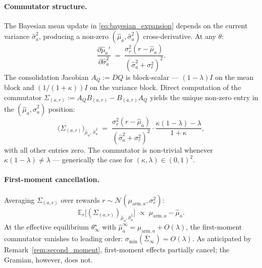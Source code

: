 \documentclass[12pt,a4paper]{article}
\begin{document}
\paragraph{Commutator structure.}
The Bayesian mean update in \eqref{eq:bayesian_expansion} depends on the
current variance $\hat\sigma_a^2$, producing a non-zero $(\hat\mu_a, \hat\sigma_a^2)$
cross-derivative. At any $\theta$:
\[
  \frac{\partial \hat\mu_a'}{\partial \hat\sigma_a^2}
  \;=\; \frac{\sigma_r^2(r - \hat\mu_a)}{(\hat\sigma_a^2 + \sigma_r^2)^2}.
\]
The consolidation Jacobian $A_Q := DQ$ is block-scalar — $(1-\lambda)I$
on the mean block and $(1/(1+\kappa))I$ on the variance block. Direct
computation of the commutator $\Sigma_{(a,r)} := A_Q B_{(a,r)} - B_{(a,r)} A_Q$
yields the unique non-zero entry in the $(\hat\mu_a, \hat\sigma_a^2)$
position:
\begin{equation}
\label{eq:bandit_commutator}
\bigl(\Sigma_{(a,r)}\bigr)_{\hat\mu_a,\,\hat\sigma_a^2}
\;=\; \frac{\sigma_r^2(r - \hat\mu_a)}{(\hat\sigma_a^2 + \sigma_r^2)^2}
      \cdot \frac{\kappa(1-\lambda) - \lambda}{1+\kappa},
\end{equation}
with all other entries zero. The commutator is non-trivial whenever
$\kappa(1-\lambda) \neq \lambda$ — generically the case for $(\kappa, \lambda) \in (0,1)^2$.

\paragraph{First-moment cancellation.}
Averaging $\Sigma_{(a,r)}$ over rewards
$r \sim \mathcal{N}(\mu_{\mathrm{arm},a}, \sigma_r^2)$:
\[
  \mathbb{E}_r\!\bigl[(\Sigma_{(a,r)})_{\hat\mu_a, \hat\sigma_a^2}\bigr]
  \;\propto\; \mu_{\mathrm{arm},a} - \hat\mu_a.
\]
At the effective equilibrium $\theta^\star_\infty$ with
$\hat\mu_a^\infty = \mu_{\mathrm{arm},a} + O(\lambda)$, the first-moment
commutator vanishes to leading order:
$\sigma_{\min}(\bar\Sigma_\infty) = O(\lambda)$. As anticipated by
Remark~\ref{rem:second_moment}, first-moment effects partially cancel; the
Gramian, however, does not.
\end{document}
